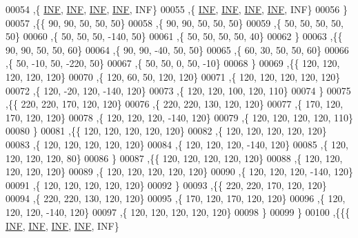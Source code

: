 \begin{DoxyCode}
00054   ,\{   \hyperlink{constants_8h_a12c2040f25d8e3a7b9e1c2024c618cb6}{INF},   \hyperlink{constants_8h_a12c2040f25d8e3a7b9e1c2024c618cb6}{INF},   \hyperlink{constants_8h_a12c2040f25d8e3a7b9e1c2024c618cb6}{INF},   \hyperlink{constants_8h_a12c2040f25d8e3a7b9e1c2024c618cb6}{INF},   INF\}
00055   ,\{   \hyperlink{constants_8h_a12c2040f25d8e3a7b9e1c2024c618cb6}{INF},   \hyperlink{constants_8h_a12c2040f25d8e3a7b9e1c2024c618cb6}{INF},   \hyperlink{constants_8h_a12c2040f25d8e3a7b9e1c2024c618cb6}{INF},   \hyperlink{constants_8h_a12c2040f25d8e3a7b9e1c2024c618cb6}{INF},   INF\}
00056   \}
00057  ,\{\{    90,    90,    50,    50,    50\}
00058   ,\{    90,    90,    50,    50,    50\}
00059   ,\{    50,    50,    50,    50,    50\}
00060   ,\{    50,    50,    50,  -140,    50\}
00061   ,\{    50,    50,    50,    50,    40\}
00062   \}
00063  ,\{\{    90,    90,    50,    50,    60\}
00064   ,\{    90,    90,   -40,    50,    50\}
00065   ,\{    60,    30,    50,    50,    60\}
00066   ,\{    50,   -10,    50,  -220,    50\}
00067   ,\{    50,    50,     0,    50,   -10\}
00068   \}
00069  ,\{\{   120,   120,   120,   120,   120\}
00070   ,\{   120,    60,    50,   120,   120\}
00071   ,\{   120,   120,   120,   120,   120\}
00072   ,\{   120,   -20,   120,  -140,   120\}
00073   ,\{   120,   120,   100,   120,   110\}
00074   \}
00075  ,\{\{   220,   220,   170,   120,   120\}
00076   ,\{   220,   220,   130,   120,   120\}
00077   ,\{   170,   120,   170,   120,   120\}
00078   ,\{   120,   120,   120,  -140,   120\}
00079   ,\{   120,   120,   120,   120,   110\}
00080   \}
00081  ,\{\{   120,   120,   120,   120,   120\}
00082   ,\{   120,   120,   120,   120,   120\}
00083   ,\{   120,   120,   120,   120,   120\}
00084   ,\{   120,   120,   120,  -140,   120\}
00085   ,\{   120,   120,   120,   120,    80\}
00086   \}
00087  ,\{\{   120,   120,   120,   120,   120\}
00088   ,\{   120,   120,   120,   120,   120\}
00089   ,\{   120,   120,   120,   120,   120\}
00090   ,\{   120,   120,   120,  -140,   120\}
00091   ,\{   120,   120,   120,   120,   120\}
00092   \}
00093  ,\{\{   220,   220,   170,   120,   120\}
00094   ,\{   220,   220,   130,   120,   120\}
00095   ,\{   170,   120,   170,   120,   120\}
00096   ,\{   120,   120,   120,  -140,   120\}
00097   ,\{   120,   120,   120,   120,   120\}
00098   \}
00099  \}
00100 ,\{\{\{   \hyperlink{constants_8h_a12c2040f25d8e3a7b9e1c2024c618cb6}{INF},   \hyperlink{constants_8h_a12c2040f25d8e3a7b9e1c2024c618cb6}{INF},   \hyperlink{constants_8h_a12c2040f25d8e3a7b9e1c2024c618cb6}{INF},   \hyperlink{constants_8h_a12c2040f25d8e3a7b9e1c2024c618cb6}{INF},   INF\}

\end{DoxyCode}
